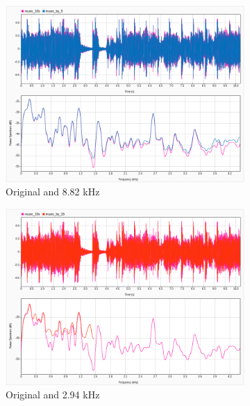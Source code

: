 \documentclass[12pt]{article}
\begin{document}
\begin{figure}[htbp]
  \centering
  \begin{subfigure}[b]{0.48\textwidth} %
    \includegraphics[width=\linewidth]{labs/lab1/lab-report-tex/figures/SigAnalyzer/part B/orig_by5.png}
    \caption{Original and 8.82 kHz}
    \label{fig:f2}
  \end{subfigure}
  \begin{subfigure}[b]{0.48\textwidth} %
    \includegraphics[width=\linewidth]{labs/lab1/lab-report-tex/figures/SigAnalyzer/part B/orig_by15.png}
    \caption{Original and 2.94 kHz}
    \label{fig:f2}
  \end{subfigure}
  \begin{subfigure}[b]{0.48\textwidth} %

\end{subfigure}
\end{figure}
\end{document}
